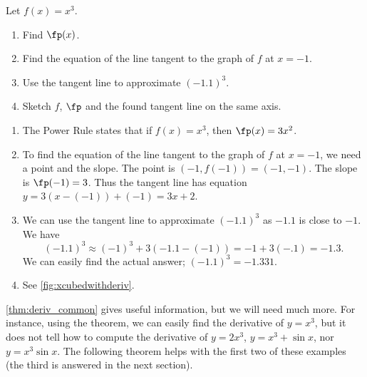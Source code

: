 \begin{example}\label{ex_deriv_rule1}
Let $f(x)=x^3$. 
\begin{enumerate}
	\item	Find $\fp(x)$.
	\item	Find the equation of the line tangent to the graph of $f$ at $x=-1$. 
	\item	Use the tangent line to approximate $(-1.1)^3$.
	\item	Sketch $f$, $\fp$ and the found tangent line on the same axis.
\end{enumerate}
\solution
\begin{enumerate}
	\item	The Power Rule states that if $f(x) = x^3$, then $\fp(x) = 3x^2$. 
	\item	To find the equation of the line tangent to the graph of $f$ at $x=-1$, we need a point and the slope. The point is $(-1,f(-1)) = (-1, -1)$. The slope is $\fp(-1)= 3$. Thus the tangent line has equation $y = 3(x-(-1))+(-1) = 3x+2$. 

	\item	We can use the tangent line to approximate $(-1.1)^3$ as $-1.1$ is close to $-1$. We have
	\[(-1.1)^3 \approx (-1)^3+3(-1.1-(-1))=-1+3(-.1)= -1.3.\]
	We can easily find the actual answer; $(-1.1)^3 = -1.331$. 
	\item	See \autoref{fig:xcubedwithderiv}.
\end{enumerate}
\end{example}

\autoref{thm:deriv_common} gives useful information, but we will need much more. For instance, using the theorem, we can easily find the derivative of $y=x^3$, but it does not tell how to compute the derivative of $y=2x^3$, $y=x^3+\sin x$, nor $y=x^3\sin x$. The following theorem helps with the first two of these examples (the third is answered in the next section).

